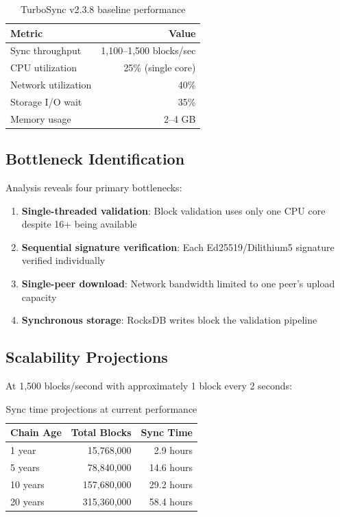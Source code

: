 \documentclass[11pt,a4paper]{article}
\begin{document}
\begin{table}[h]
\centering
\begin{tabular}{lr}
\toprule
\textbf{Metric} & \textbf{Value} \\
\midrule
Sync throughput & 1,100--1,500 blocks/sec \\
CPU utilization & 25\% (single core) \\
Network utilization & 40\% \\
Storage I/O wait & 35\% \\
Memory usage & 2--4 GB \\
\bottomrule
\end{tabular}
\caption{TurboSync v2.3.8 baseline performance}
\end{table}

\subsection{Bottleneck Identification}

Analysis reveals four primary bottlenecks:

\begin{enumerate}
    \item \textbf{Single-threaded validation}: Block validation uses only one CPU core despite 16+ being available
    \item \textbf{Sequential signature verification}: Each Ed25519/Dilithium5 signature verified individually
    \item \textbf{Single-peer download}: Network bandwidth limited to one peer's upload capacity
    \item \textbf{Synchronous storage}: RocksDB writes block the validation pipeline
\end{enumerate}

\subsection{Scalability Projections}

At 1,500 blocks/second with approximately 1 block every 2 seconds:

\begin{table}[h]
\centering
\begin{tabular}{lrr}
\toprule
\textbf{Chain Age} & \textbf{Total Blocks} & \textbf{Sync Time} \\
\midrule
1 year & 15,768,000 & 2.9 hours \\
5 years & 78,840,000 & 14.6 hours \\
10 years & 157,680,000 & 29.2 hours \\
20 years & 315,360,000 & 58.4 hours \\
\bottomrule
\end{tabular}
\caption{Sync time projections at current performance}
\end{table}
\end{document}
